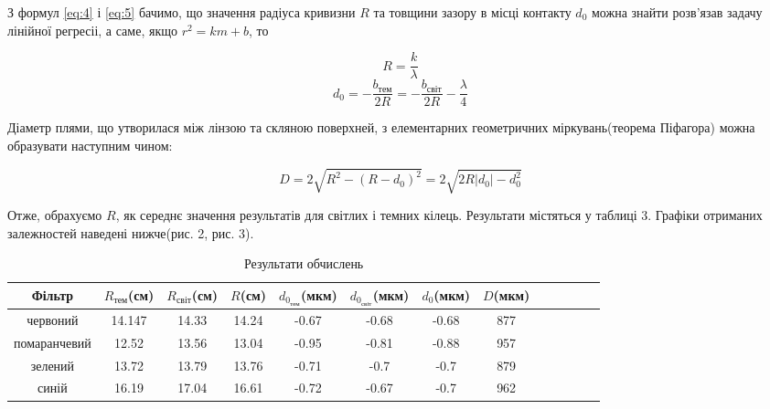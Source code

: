 З формул \ref{eq:4} і \ref{eq:5} бачимо, що значення радіуса 
кривизни $R$ та товщини зазору в місці контакту $d_0$ можна знайти 
розв'язав задачу лінійної регресіі, а саме, якщо $r^2 = k m + b$, то

$$ R = \frac{k}{\lambda} $$
$$ d_0 = - \frac{b_{тем}}{2R} = - \frac{b_{світ}}{2R} - \frac{\lambda}{4} $$

Діаметр плями, що утворилася між лінзою та скляною поверхней, з елементарних
геометричних міркувань(теорема Піфагора) можна образувати наступним чином:

$$ D = 2 \sqrt{R^2 - (R-d_0)^2} = 2 \sqrt{2R|d_0| - d_0^2} $$

Отже, обрахуємо $R$, як середнє значення результатів для світлих і темних 
кілець. Результати містяться у таблиці 3. Графіки отриманих залежностей наведені нижче(рис. 2, рис. 3).

\begin{table}[h]
    \centering
    \begin{tabular}{|c|c|c|c|c|c|c|c|c|c|c|c|c|}
        \hline
        \textbf{Фільтр} & \textbf{$R_{тем}$(см)} & \textbf{$R_{світ}$(см)} & \textbf{$R$(см)} &
        \textbf{$d_{0_{тем}}$(мкм)} & \textbf{$d_{0_{світ}}$(мкм)} & \textbf{$d_0$(мкм)} & \textbf{$D$(мкм)} \\
        \hline

        червоний & 14.147 & 14.33 & 14.24 & -0.67 & -0.68 & -0.68 & 877 \\
        \hline
        
        помаранчевий & 12.52 & 13.56 & 13.04 & -0.95 & -0.81 & -0.88 & 957 \\
        \hline
        
        зелений & 13.72 & 13.79 & 13.76 & -0.71 & -0.7 & -0.7 & 879 \\
        \hline

        синій & 16.19 & 17.04 & 16.61 & -0.72 & -0.67 & -0.7 & 962 \\
        \hline

    \end{tabular}
    \caption{Результати обчислень}
\end{table}



